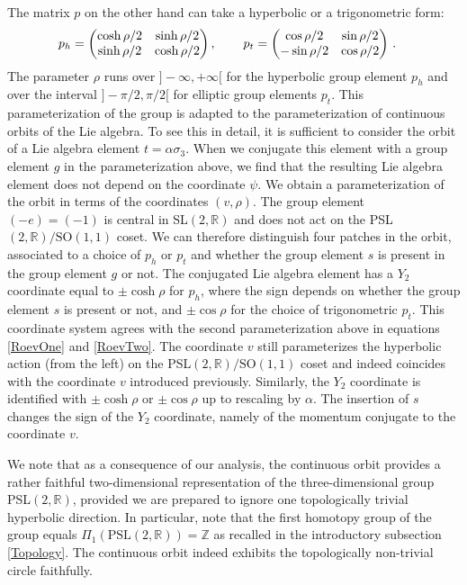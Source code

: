 \documentclass[12pt]{article}
\numberwithin{equation}{section}
\numberwithin{equation}{section}
\numberwithin{table}{section}\setlength{\multlinegap}{25pt}
\begin{document}
The matrix $p$ on the other hand can take a hyperbolic or a trigonometric form:
\begin{align}
p_{h} &= 
\begin{pmatrix}
\cosh \rho/2 & \sinh \rho/2 \\
\sinh \rho/2 & \cosh \rho/2 
\end{pmatrix}, \hspace{.75cm} 
p_t = 
\begin{pmatrix}
\cos \rho/2 & \sin \rho/2\\
-\sin \rho/2 & \cos \rho/2 
\end{pmatrix}\, .
\end{align}
The parameter $\rho$ runs over $]-\infty, +\infty[$ for the hyperbolic group element $p_h$ and over the interval $]-\pi/2,\pi/2[$ for elliptic group elements $p_t$. This parameterization of the group is  adapted to the parameterization of continuous orbits of the Lie algebra. To see this in detail, it is sufficient to consider the orbit of a Lie algebra element $t=\alpha \sigma_3$. When we conjugate this element with a group element $g$ in the parameterization above, we find that the resulting Lie algebra element does not depend on the coordinate $\psi$. We obtain a parameterization of the orbit in terms of the coordinates $(v,\rho)$. The group element $(-e)=(-1)$ is central in SL$(2,\mathbb{R})$ and  does not act on the  PSL$(2,\mathbb{R})/\mathrm{SO}(1,1)$ coset. We can therefore distinguish four patches in the orbit, associated to a choice of $p_{h}$ or $p_t$ and whether the group element $s$ is present in the group element $g$ or not. The conjugated Lie algebra element has a $Y_2$ coordinate equal to  $\pm \cosh \rho$ for $p_h$, where the sign depends  on whether the group element $s$ is present or not, and $\pm \cos \rho$ for the choice of trigonometric $p_t$.
This coordinate system agrees with the second parameterization above in equations \eqref{RoevOne} and \eqref{RoevTwo}.
 The coordinate $v$ still parameterizes the hyperbolic action (from the left) on the PSL$(2,\mathbb{R})/\mathrm{SO}(1,1)$ coset and indeed coincides with the coordinate $v$ introduced previously. Similarly, the $Y_2$ coordinate is identified with $\pm \cosh \rho$ or $\pm \cos \rho$ up to rescaling by $\alpha$. The insertion of $s$ changes the sign of the $Y_2$ coordinate, namely of the momentum conjugate to the coordinate $v$. 


We note that as a consequence of our analysis, the continuous orbit provides a rather faithful two-dimensional representation of the three-dimensional group PSL$(2,\mathbb{R})$, provided we are prepared to ignore one topologically trivial hyperbolic direction. In particular, note that the first homotopy group of the group equals $\Pi_1(\text{PSL}(2,\mathbb{R}))=\mathbb{Z}$ as recalled in the introductory subsection \ref{Topology}. The continuous orbit indeed exhibits the topologically non-trivial circle faithfully. 
\end{document}
